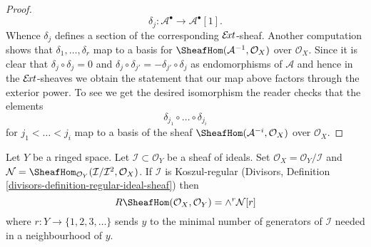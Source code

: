 \begin{proof}
$$\delta_j : \mathcal{A}^\bullet \to \mathcal{A}^\bullet[1].
$$
Whence $\delta_j$ defines a section of the corresponding
$\mathcal{E}\!{\it xt}$-sheaf.
Another computation shows that $\delta_1, \ldots, \delta_r$
map to a basis for $\SheafHom(\mathcal{A}^{-1}, \mathcal{O}_X)$
over $\mathcal{O}_X$.
Since it is clear that $\delta_j \circ \delta_j = 0$
and $\delta_j \circ \delta_{j'} = - \delta_{j'} \circ \delta_j$
as endomorphisms of $\mathcal{A}$ and hence in the
$\mathcal{E}\!{\it xt}$-sheaves
we obtain the statement that our map above factors through
the exterior power. To see we get the desired isomorphism
the reader checks that the elements
$$
\delta_{j_1} \circ \ldots \circ \delta_{j_i}
$$
for $j_1 < \ldots < j_i$ map to a basis of the sheaf
$\SheafHom(\mathcal{A}^{-i}, \mathcal{O}_X)$
over $\mathcal{O}_X$.
\end{proof}

\begin{lemma}
\label{lemma-regular-immersion-ext}
Let $Y$ be a ringed space. Let $\mathcal{I} \subset \mathcal{O}_Y$
be a sheaf of ideals. Set $\mathcal{O}_X = \mathcal{O}_Y/\mathcal{I}$ and
$\mathcal{N} =
\SheafHom_{\mathcal{O}_Y}(\mathcal{I}/\mathcal{I}^2, \mathcal{O}_X)$.
If $\mathcal{I}$ is Koszul-regular
(Divisors, Definition \ref{divisors-definition-regular-ideal-sheaf}) then
$$
R\SheafHom(\mathcal{O}_X, \mathcal{O}_Y) = \wedge^r \mathcal{N}[r]
$$
where $r : Y \to \{1, 2, 3, \ldots \}$ sends $y$ to
the minimal number of generators of $\mathcal{I}$ needed in a neighbourhood
of $y$.
\end{lemma}

